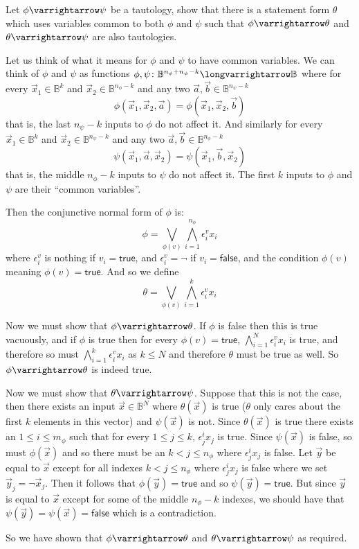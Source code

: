 \documentclass[10pt]{article}
\let\to=\varrightarrow
\let\longto=\longvarrightarrow
\def\bB{\mathbb{B}}
\def\true{\mathsf{true}}
\def\false{\mathsf{false}}
\begin{document}
\begin{exercise*}

    Let $\phi\to\psi$ be a tautology, show that there is a statement form $\theta$ which uses variables common to both $\phi$ and $\psi$ such that $\phi\to\theta$ and $\theta\to\psi$ are also tautologies.

\end{exercise*}

\begin{blankpp}

    Let us think of what it means for $\phi$ and $\psi$ to have common variables.
    We can think of $\phi$ and $\psi$ as functions $\phi,\psi\colon\bB^{n_\phi+n_\psi-k}\longto\bB$ where for every $\vec x_1\in\bB^k$ and $\vec x_2\in\bB^{n_\phi-k}$ and any two
    $\vec a,\vec b\in\bB^{n_\psi-k}$
    \[ \phi(\vec x_1, \vec x_2, \vec a) = \phi(\vec x_1, \vec x_2, \vec b) \]
    that is, the last $n_\psi-k$ inputs to $\phi$ do not affect it.
    And similarly for every $\vec x_1\in\bB^k$ and $\vec x_2\in\bB^{n_\psi-k}$ and any two $\vec a,\vec b\in\bB^{n_\phi-k}$
    \[ \psi(\vec x_1, \vec a, \vec x_2) = \psi(\vec x_1, \vec b, \vec x_2) \]
    that is, the middle $n_\phi-k$ inputs to $\psi$ do not affect it.
    The first $k$ inputs to $\phi$ and $\psi$ are their ``common variables''.

    Then the conjunctive normal form of $\phi$ is:
    \[ \phi = \bigvee_{\phi(v)}\bigwedge_{i=1}^{n_\phi} \epsilon_i^v x_i \]
    where $\epsilon_i^v$ is nothing if $v_i=\true$, and $\epsilon_i^v=\neg$ if $v_i=\false$, and the condition $\phi(v)$ meaning $\phi(v)=\true$.
    And so we define
    \[ \theta = \bigvee_{\phi(v)}\bigwedge_{i=1}^k \epsilon_i^v x_i \]

    Now we must show that $\phi\to\theta$.
    If $\phi$ is false then this is true vacuously, and if $\phi$ is true then for every $\phi(v)=\true$, $\bigwedge_{i=1}^N \epsilon_i^v x_i$ is true, and therefore so must
    $\bigwedge_{i=1}^k \epsilon_i^v x_i$ as $k\leq N$ and therefore $\theta$ must be true as well.
    So $\phi\to\theta$ is indeed true.

    Now we must show that $\theta\to\psi$.
    Suppose that this is not the case, then there exists an input $\vec x\in\bB^N$ where $\theta(\vec x)$ is true ($\theta$ only cares about the first $k$ elements in this vector) and $\psi(\vec x)$ is not.
    Since $\theta(\vec x)$ is true there exists an $1\leq i\leq m_\phi$ such that for every $1\leq j\leq k$, $\epsilon_j^i x_j$ is true.
    Since $\psi(\vec x)$ is false, so must $\phi(\vec x)$ and so there must be an $k<j\leq n_\phi$ where $\epsilon_j^i x_j$ is false.
    Let $\vec y$ be equal to $\vec x$ except for all indexes $k<j\leq n_\phi$ where $\epsilon_j^i x_j$ is false where we set $\vec y_j=\neg\vec x_j$.
    Then it follows that $\phi(\vec y)=\true$ and so $\psi(\vec y)=\true$.
    But since $\vec y$ is equal to $\vec x$ except for some of the middle $n_\phi-k$ indexes, we should have that $\psi(\vec y)=\psi(\vec x)=\false$ which is a contradiction.

    So we have shown that $\phi\to\theta$ and $\theta\to\psi$ as required.

\end{blankpp}
\end{document}
